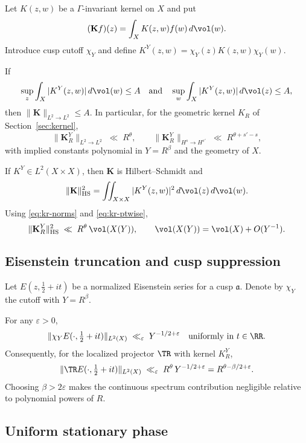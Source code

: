 Let $K(z,w)$ be a $\Gamma$-invariant kernel on $X$ and put
\[
(\mathbf{K}f)(z)=\int_X K(z,w)f(w)\,d\vol(w).
\]
Introduce cusp cutoff $\chi_Y$ and define $K^Y(z,w)=\chi_Y(z)K(z,w)\chi_Y(w)$.

\begin{lemma}\label{lem:schur}
If
\[
\sup_z \int_X |K^Y(z,w)|\,d\vol(w) \le A
\quad\text{and}\quad
\sup_w \int_X |K^Y(z,w)|\,d\vol(z) \le A,
\]
then $\|\mathbf{K}\|_{L^2\to L^2}\le A$. In particular, for the geometric
kernel $K_R$ of Section~\ref{sec:kernel},
\begin{equation}\label{eq:schur-concl}
\|\mathbf{K}_R^Y\|_{L^2\to L^2}\;\ll\; R^\theta,
\qquad
\|\mathbf{K}_R^Y\|_{H^s\to H^{s'}}\;\ll\; R^{\theta+s'-s},
\end{equation}
with implied constants polynomial in $Y=R^\beta$ and the geometry of $X$.
\end{lemma}

\begin{lemma}\label{lem:hs}
If $K^Y\in L^2(X\times X)$, then $\mathbf{K}$ is Hilbert--Schmidt and
\[
\|\mathbf{K}\|_{\mathrm{HS}}^2=\iint_{X\times X} |K^Y(z,w)|^2\,d\vol(z)\,d\vol(w).
\]
Using \eqref{eq:kr-norms} and \eqref{eq:kr-ptwise},
\[
\|\mathbf{K}_R^Y\|_{\mathrm{HS}}^2 \;\ll\; R^\theta\,\vol(X(Y)),
\qquad \vol(X(Y))=\vol(X)+O(Y^{-1}).
\]
\end{lemma}

\subsection{Eisenstein truncation and cusp suppression}
\label{app:aux:eisenstein}

Let $E(z,\tfrac12+it)$ be a normalized Eisenstein series for a cusp $\mathfrak a$.
Denote by $\chi_Y$ the cutoff with $Y=R^\beta$.

\begin{lemma}\label{lem:eisen}
For any $\varepsilon>0$,
\[
\|\chi_Y E(\cdot,\tfrac12+it)\|_{L^2(X)} \;\ll_\varepsilon\; Y^{-1/2+\varepsilon}
\quad\text{uniformly in } t\in\RR.
\]
Consequently, for the localized projector $\TR$ with kernel $K_R^Y$,
\[
\|\TR E(\cdot,\tfrac12+it)\|_{L^2(X)} \;\ll_\varepsilon\; R^\theta\,Y^{-1/2+\varepsilon}
= R^{\theta-\beta/2+\varepsilon}.
\]
Choosing $\beta>2\varepsilon$ makes the continuous spectrum contribution negligible
relative to polynomial powers of $R$.
\end{lemma}

\subsection{Uniform stationary phase}
\label{app:aux:stationary}

